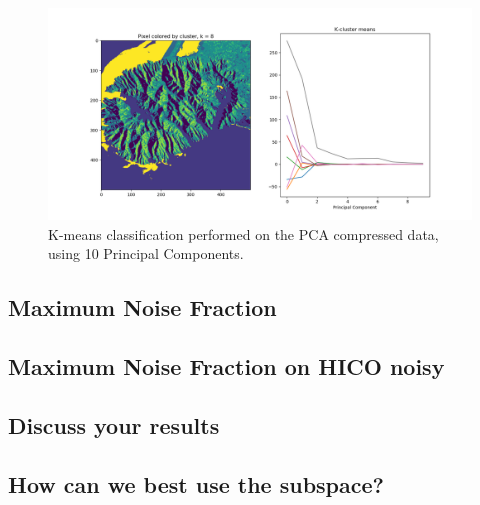 \begin{figure}
    \centering
    \includegraphics[width=\textwidth]{../fig/kmean/PCA_8}
    \caption{K-means classification performed on the PCA compressed data, using 10 Principal Components.}
    \label{fig:pca_kmean}
\end{figure}


\subsection{Maximum Noise Fraction}

\subsection{Maximum Noise Fraction on HICO noisy}

\subsection{Discuss your results}

\subsection{How can we best use the subspace?}
